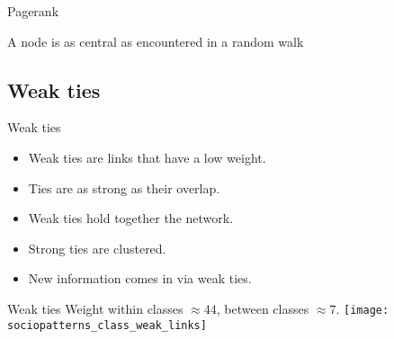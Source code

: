 \documentclass[hide notes,compress]{beamer}
\begin{document}
\begin{frame}[t]{Pagerank}
  \begin{overlayarea}{\linewidth}{5mm}
  A node is as central as encountered in a random walk %
  \end{overlayarea}
  \begin{overlayarea}{\linewidth}{\textheight}
  \end{overlayarea}
\end{frame}


\subsection{Weak ties}

\begin{frame}[c]{Weak ties}
  \begin{itemize}
    \item Weak ties are links that have a low weight.
    \item Ties are as strong as their overlap.
    \item Weak ties hold together the network.
    \item Strong ties are clustered.
    \item New information comes in via weak ties.
  \end{itemize}
\end{frame}

\begin{frame}[t]{Weak ties}
  Weight within classes $\approx 44$, between classes $\approx 7$.
  \texttt{[image: sociopatterns\_class\_weak\_links]}
\end{frame}
\end{document}
